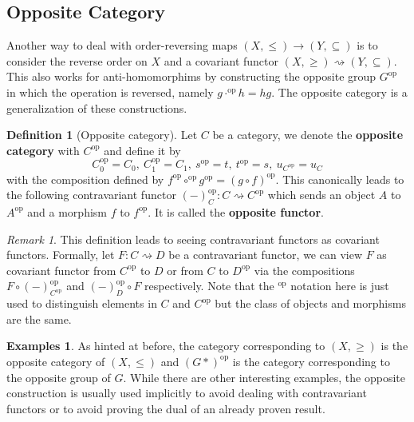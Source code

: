 \documentclass{article}
\theoremstyle{definition}
\newtheorem{defn}[thm]{Definition}
\newtheorem{exmps}[thm]{Examples}
\theoremstyle{remark}
\newtheorem{rem}[thm]{Remark}
\newcommand{\op}[1]{#1^{\text{op}}}
\begin{document}
\subsection{Opposite Category}
Another way to deal with order-reversing maps $(X, \leq) \rightarrow (Y, \subseteq)$ is to consider the reverse order on $X$ and a covariant functor $(X, \geq) \rightsquigarrow (Y, \subseteq)$. This also works for anti-homomorphims by constructing the opposite group $\op{G}$ in which the operation is reversed, namely $g\op{\cdot} h = hg$. The opposite category is a generalization of these constructions.

\begin{defn}[Opposite category]
	Let $C$ be a category, we denote the \textbf{opposite category} with $\op{C}$ and define it by 
	\[ \op{C}_0 = C_0,\ \op{C}_1 = C_1,\ \op{s} = t,\ \op{t} = s,\ u_{\op{C}} = u_C\]
	with the composition defined by $\op{f}\op{\circ}\op{g} = \op{(g\circ f)}$. This canonically leads to the following contravariant functor $\op{(-)}_C: C \rightsquigarrow \op{C}$ which sends an object $A$ to $\op{A}$ and a morphism $f$ to $\op{f}$. It is called the \textbf{opposite functor}.
\end{defn}
\begin{rem}
	This definition leads to seeing contravariant functors as covariant functors. Formally, let $F:C\rightsquigarrow D$ be a contravariant functor, we can view $F$ as covariant functor from $\op{C}$ to $D$ or from $C$ to $\op{D}$ via the compositions $F\circ \op{(-)}_{\op{C}}$ and $\op{(-)}_{D}\circ F$ respectively. Note that the $\op{}$ notation here is just used to distinguish elements in $C$ and $\op{C}$ but the class of objects and morphisms are the same.
\end{rem}

\begin{exmps}
	As hinted at before, the category corresponding to $(X, \geq)$ is the opposite category of $(X, \leq)$ and $\op{(G\ast)}$ is the category corresponding to the opposite group of $G$. While there are other interesting examples, the opposite construction is usually used implicitly to avoid dealing with contravariant functors or to avoid proving the dual of an already proven result.
\end{exmps}
\end{document}
